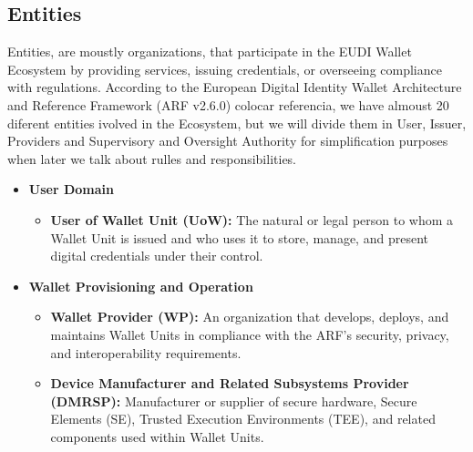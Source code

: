 \documentclass[sigconf,balance,nonacm,authordraft]{acmart}
\begin{document}
\subsection{Entities}
Entities, are moustly organizations, that participate in the EUDI Wallet Ecosystem by providing services, issuing credentials, or overseeing compliance with regulations.
According to the European Digital Identity Wallet Architecture and Reference Framework (ARF v2.6.0) {colocar referencia}, we have almoust 20 diferent entities ivolved in the Ecosystem, but we will divide them in User, Issuer, Providers and Supervisory and Oversight Authority for simplification purposes when later we talk about rulles and responsibilities.
\begin{itemize}

  \item \textbf{User Domain}
    \begin{itemize}
      \item \textbf{User of Wallet Unit (UoW):}
      The natural or legal person to whom a Wallet Unit is issued and who uses it to store, manage, and present digital credentials under their control.
    \end{itemize}

  \item \textbf{Wallet Provisioning and Operation}
    \begin{itemize}
      \item \textbf{Wallet Provider (WP):}
      An organization that develops, deploys, and maintains Wallet Units in compliance with the ARF’s security, privacy, and interoperability requirements.
      \item \textbf{Device Manufacturer and Related Subsystems Provider (DMRSP):}
      Manufacturer or supplier of secure hardware, Secure Elements (SE), Trusted Execution Environments (TEE), and related components used within Wallet Units.
    \end{itemize}


\end{itemize}
\end{document}
